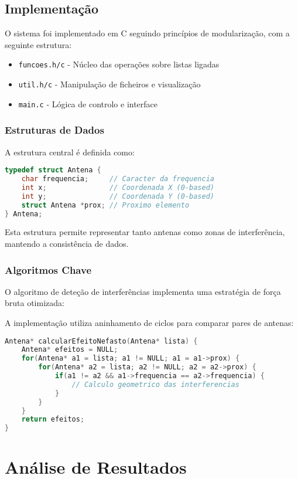 \documentclass[a4paper,12pt]{report}
\begin{document}
\section{Implementação}
O sistema foi implementado em C seguindo princípios de modularização, com a seguinte estrutura:

\begin{itemize}
    \item \texttt{funcoes.h/c} - Núcleo das operações sobre listas ligadas
    \item \texttt{util.h/c} - Manipulação de ficheiros e visualização
    \item \texttt{main.c} - Lógica de controlo e interface
\end{itemize}

\subsection{Estruturas de Dados}
A estrutura central é definida como:

\begin{lstlisting}[language=C]
typedef struct Antena {
    char frequencia;     // Caracter da frequencia
    int x;               // Coordenada X (0-based)
    int y;               // Coordenada Y (0-based)
    struct Antena *prox; // Proximo elemento
} Antena;
\end{lstlisting}

Esta estrutura permite representar tanto antenas como zonas de interferência, mantendo a consistência de dados.

\subsection{Algoritmos Chave}
O algoritmo de deteção de interferências implementa uma estratégia de força bruta otimizada:

A implementação utiliza aninhamento de ciclos para comparar pares de antenas:

\begin{lstlisting}[language=C]
Antena* calcularEfeitoNefasto(Antena* lista) {
    Antena* efeitos = NULL;
    for(Antena* a1 = lista; a1 != NULL; a1 = a1->prox) {
        for(Antena* a2 = lista; a2 != NULL; a2 = a2->prox) {
            if(a1 != a2 && a1->frequencia == a2->frequencia) {
                // Calculo geometrico das interferencias
            }
        }
    }
    return efeitos;
}
\end{lstlisting}

\chapter{Análise de Resultados}
\end{document}
